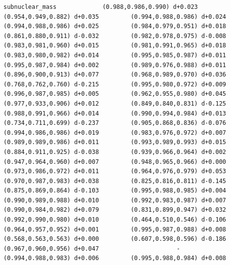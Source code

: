 \documentclass[11pt, letterpaper, openany]{book}
\begin{document}
\begin{empiricalbox}
\begin{lstlisting}[style=terminal]
subnuclear_mass             (0.988,0.986,0.990) d+0.023         (0.954,0.949,0.882) d+0.035         (0.994,0.988,0.986) d+0.024         (0.994,0.988,0.986) d+0.025         (0.984,0.979,0.951) d+0.018         (0.861,0.880,0.911) d-0.032         (0.982,0.978,0.975) d-0.008         (0.983,0.981,0.960) d+0.015         (0.981,0.991,0.965) d+0.018         (0.983,0.980,0.982) d+0.014         (0.995,0.985,0.987) d+0.011         (0.995,0.987,0.984) d+0.002         (0.989,0.976,0.988) d+0.011         (0.896,0.900,0.913) d+0.077         (0.968,0.989,0.970) d+0.036         (0.768,0.762,0.760) d-0.215         (0.995,0.980,0.972) d+0.009         (0.996,0.987,0.985) d+0.005         (0.962,0.955,0.980) d+0.045         (0.977,0.933,0.906) d+0.012         (0.849,0.840,0.831) d-0.125         (0.988,0.991,0.966) d+0.014         (0.990,0.994,0.984) d+0.013         (0.734,0.711,0.699) d-0.237         (0.905,0.868,0.836) d-0.076         (0.994,0.986,0.986) d+0.019         (0.983,0.976,0.972) d+0.007         (0.989,0.989,0.986) d+0.011         (0.993,0.989,0.993) d+0.015         (0.884,0.911,0.925) d-0.038         (0.939,0.966,0.964) d+0.002         (0.947,0.964,0.960) d+0.007         (0.948,0.965,0.966) d+0.000         (0.973,0.986,0.972) d+0.011         (0.964,0.976,0.979) d+0.053         (0.970,0.987,0.983) d+0.038         (0.825,0.816,0.811) d-0.145         (0.875,0.869,0.864) d-0.103         (0.995,0.988,0.985) d+0.004         (0.990,0.989,0.988) d+0.010         (0.992,0.983,0.987) d+0.007         (0.990,0.984,0.982) d+0.079         (0.831,0.899,0.947) d+0.032         (0.992,0.990,0.980) d+0.010         (0.464,0.510,0.546) d-0.106         (0.964,0.957,0.952) d+0.001         (0.995,0.987,0.988) d+0.008         (0.568,0.563,0.563) d+0.000         (0.607,0.598,0.596) d-0.186         (0.967,0.960,0.956) d+0.047                      -                      (0.994,0.988,0.983) d+0.006         (0.995,0.988,0.984) d+0.008     

\end{lstlisting}
\end{empiricalbox}
\end{document}

